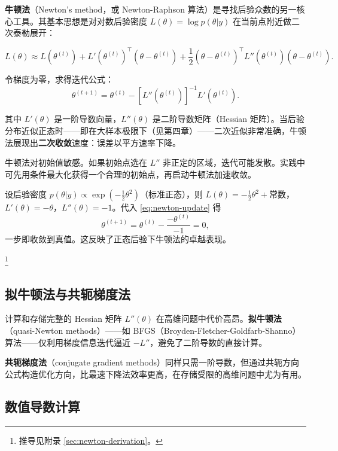 \textbf{牛顿法}（Newton's method，或 Newton-Raphson 算法）是寻找后验众数的另一核心工具。其基本思想是对对数后验密度 $L(\theta) = \log p(\theta|y)$ 在当前点附近做二次泰勒展开：

\[
L(\theta) \approx L(\theta^{(t)}) + L'(\theta^{(t)})^\top (\theta - \theta^{(t)}) + \frac{1}{2}(\theta - \theta^{(t)})^\top L''(\theta^{(t)})(\theta - \theta^{(t)}).
\]

令梯度为零，求得迭代公式：
\begin{equation}\label{eq:newton-update}
\theta^{(t+1)} = \theta^{(t)} - [L''(\theta^{(t)})]^{-1} L'(\theta^{(t)}).
\end{equation}

其中 $L'(\theta)$ 是一阶导数向量，$L''(\theta)$ 是二阶导数矩阵（Hessian 矩阵）。当后验分布近似正态时——即在大样本极限下（见第四章）——二次近似非常准确，牛顿法展现出\textbf{二次收敛}速度：误差以平方速率下降。

\begin{Remark}[初始值的重要性]
牛顿法对初始值敏感。如果初始点选在 $L''$ 非正定的区域，迭代可能发散。实践中可先用条件最大化获得一个合理的初始点，再启动牛顿法加速收敛。
\end{Remark}

\begin{Example}[一维牛顿法]\label{ex:newton-1d}
设后验密度 $p(\theta|y) \propto \exp(-\frac{1}{2}\theta^2)$（标准正态），则 $L(\theta) = -\frac{1}{2}\theta^2 + \text{常数}$，$L'(\theta) = -\theta$，$L''(\theta) = -1$。代入 \cref{eq:newton-update} 得
\[
\theta^{(t+1)} = \theta^{(t)} - \frac{-\theta^{(t)}}{-1} = 0,
\]
一步即收敛到真值。这反映了正态后验下牛顿法的卓越表现。
\end{Example}\footnote{推导见附录 \cref{sec:newton-derivation}。}

\subsection{拟牛顿法与共轭梯度法}\label{sec:quasi-newton}

计算和存储完整的 Hessian 矩阵 $L''(\theta)$ 在高维问题中代价高昂。\textbf{拟牛顿法}（quasi-Newton methods）——如 BFGS（Broyden-Fletcher-Goldfarb-Shanno）算法——仅利用梯度信息迭代逼近 $-L''$，避免了二阶导数的直接计算。

\textbf{共轭梯度法}（conjugate gradient methods）同样只需一阶导数，但通过共轭方向公式构造优化方向，比最速下降法效率更高，在存储受限的高维问题中尤为有用。

\subsection{数值导数计算}\label{sec:numerical-derivatives}

